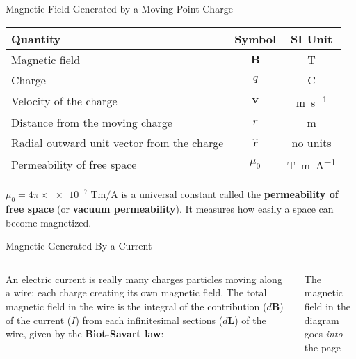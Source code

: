 \documentclass[12pt,aspectratio=169]{beamer}
\begin{document}
\begin{frame}{Magnetic Field Generated by a Moving Point Charge}

  \begin{center}
    \begin{tabular}{l|c|c}
      \rowcolor{pink}
      \textbf{Quantity} & \textbf{Symbol} & \textbf{SI Unit} \\ \hline
      Magnetic field                  & $\bm{B}$ & \si{\tesla}\\
      Charge                          & $q$      & \si{\coulomb}\\
      Velocity of the charge          & $\bm{v}$ & \si{\metre\per\second}\\
      Distance from the moving charge & $r$      & \si{\metre}\\
      Radial outward unit vector from the charge & $\hat{\bm{r}}$ & no units\\
      Permeability of free space & $\mu_0$ & \si{\tesla\metre\per\ampere}
    \end{tabular}
  \end{center}
  $\mu_0=4\pi\times\num{e-7}\;\si{\tesla\metre\per\ampere}$ is a universal
  constant called the \textbf{permeability of free space} (or
  \textbf{vacuum permeability}). It measures how easily a space can become
  magnetized.
\end{frame}



\begin{frame}{Magnetic Generated By a Current}
  \begin{columns}
    
    An electric current is really many charges particles moving along a wire;
    each charge creating its own magnetic field.
    The total magnetic field in the wire is the integral of the contribution
    ($d\bm{B}$) of the current ($I$) from each infinitesimal sections
    ($d\bm{L}$) of the wire, given by the \textbf{Biot-Savart law}:
  

    The magnetic field in the diagram goes \emph{into} the page
  \end{columns}
\end{frame}
\end{document}
